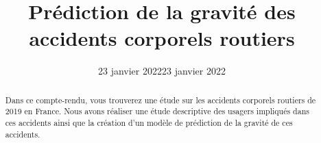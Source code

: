\documentclass[french,]{tp}
\title{Prédiction de la gravité des accidents corporels routiers}
\author{}
\date{23 janvier 2022}
\date{23 janvier 2022}
\begin{document}

\thispagestyle{plain}
\maketitle


\begin{abstract}
Dans ce compte-rendu, vous trouverez une étude sur les accidents corporels routiers de 2019 en France.
Nous avons réaliser une étude descriptive des usagers impliqués dans ces accidents ainsi que la création d'un modèle de prédiction de la gravité de ces accidents.
\end{abstract}



{
\hypersetup{linkcolor=black}
\setcounter{tocdepth}{3}
\tableofcontents
}
\end{document}
